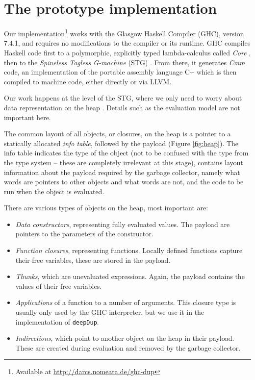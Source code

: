 \documentclass[preprint]{sigplanconf}
\theoremstyle{nonumberplain}
\newcommand{\li}{\lstinline[style=Haskell]}
\begin{document}
\section{The prototype implementation}
\label{sec:prototype}

Our implementation\footnote{Available at \url{http://darcs.nomeata.de/ghc-dup}} works with the Glasgow Haskell Compiler (GHC), version 7.4.1, and requires no modifications to the compiler or its runtime. GHC compiles Haskell code first to a polymorphic, explicitly typed lambda-calculus called \emph{Core} \citep{core,system-fc}, then to the \emph{Spineless Tagless G-machine} (STG) \citep{stg}. From there, it generates \emph{Cmm} code, an implementation of the portable assembly language C-{}- which is then compiled to machine code, either directly or via LLVM.

Our work happens at the level of the STG, where we only need to worry about data representation on the heap \citep{stg}. Details such as the evaluation model \cite{evalapply} are not important here.

The common layout of all objects, or closures,  on the heap is a pointer to a statically allocated \emph{info table}, followed by the payload (Figure \ref{fig:heap}). The info table indicates the type of the object (not to be confused with the type from the type system – these are completely irrelevant at this stage), contains layout information about the payload required by the garbage collector, namely what words are pointers to other objects and what words are not, and the code to be run when the object is evaluated.

There are various types of objects on the heap, most important are:
\begin{itemize}
\item \emph{Data constructors}, representing fully evaluated values. The payload are pointers to the parameters of the constructor.
\item \emph{Function closures}, representing functions. Locally defined functions capture their free variables, these are stored in the payload.
\item \emph{Thunks}, which are unevaluated expressions. Again, the payload contains the values of their free variables.
\item \emph{Applications} of a function to a number of arguments. This closure type is usually only used by the GHC interpreter, but we use it in the implementation of \li-deepDup-.
\item \emph{Indirections}, which point to another object on the heap in their payload. These are created during evaluation and removed by the garbage collector.
\end{itemize}
\end{document}
